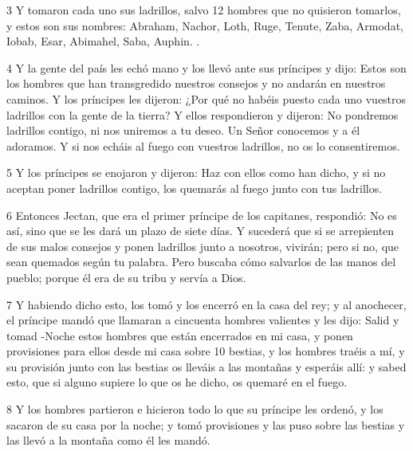 \par 3 Y tomaron cada uno sus ladrillos, salvo 12 hombres que no quisieron tomarlos, y estos son sus nombres: Abraham, Nachor, Loth, Ruge, Tenute, Zaba, Armodat, Iobab, Esar, Abimahel, Saba, Auphin. .

\par 4 Y la gente del país les echó mano y los llevó ante sus príncipes y dijo: Estos son los hombres que han transgredido nuestros consejos y no andarán en nuestros caminos. Y los príncipes les dijeron: ¿Por qué no habéis puesto cada uno vuestros ladrillos con la gente de la tierra? Y ellos respondieron y dijeron: No pondremos ladrillos contigo, ni nos uniremos a tu deseo. Un Señor conocemos y a él adoramos. Y si nos echáis al fuego con vuestros ladrillos, no os lo consentiremos.

\par 5 Y los príncipes se enojaron y dijeron: Haz con ellos como han dicho, y si no aceptan poner ladrillos contigo, los quemarás al fuego junto con tus ladrillos.

\par 6 Entonces Jectan, que era el primer príncipe de los capitanes, respondió: No es así, sino que se les dará un plazo de siete días. Y sucederá que si se arrepienten de sus malos consejos y ponen ladrillos junto a nosotros, vivirán; pero si no, que sean quemados según tu palabra. Pero buscaba cómo salvarlos de las manos del pueblo; porque él era de su tribu y servía a Dios.

\par 7 Y habiendo dicho esto, los tomó y los encerró en la casa del rey; y al anochecer, el príncipe mandó que llamaran a cincuenta hombres valientes y les dijo: Salid y tomad -Noche estos hombres que están encerrados en mi casa, y ponen provisiones para ellos desde mi casa sobre 10 bestias, y los hombres traéis a mí, y su provisión junto con las bestias os lleváis a las montañas y esperáis allí: y sabed esto, que si alguno supiere lo que os he dicho, os quemaré en el fuego.

\par 8 Y los hombres partieron e hicieron todo lo que su príncipe les ordenó, y los sacaron de su casa por la noche; y tomó provisiones y las puso sobre las bestias y las llevó a la montaña como él les mandó.

